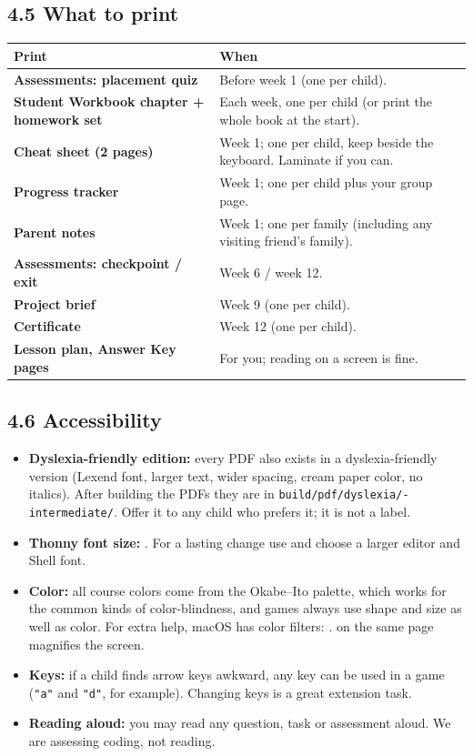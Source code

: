 \documentclass[level=2,teacher]{kidscode}
\begin{document}
\subsection{4.5 What to print}
\begin{tabularx}{\linewidth}{@{}>{\bfseries}p{4.8cm}X@{}}
\toprule
Print & When \\ \midrule
Assessments: placement quiz & Before week 1 (one per child). \\
Student Workbook chapter + homework set & Each week, one per child (or print the whole book at the start). \\
Cheat sheet (2 pages) & Week 1; one per child, keep beside the keyboard. Laminate if you can. \\
Progress tracker & Week 1; one per child plus your group page. \\
Parent notes & Week 1; one per family (including any visiting friend's family). \\
Assessments: checkpoint / exit & Week 6 / week 12. \\
Project brief & Week 9 (one per child). \\
Certificate & Week 12 (one per child). \\
Lesson plan, Answer Key pages & For you; reading on a screen is fine. \\
\bottomrule
\end{tabularx}

\subsection{4.6 Accessibility}
\begin{itemize}[itemsep=1pt]
  \item \textbf{Dyslexia-friendly edition:} every PDF also exists in a dyslexia-friendly version
        (Lexend font, larger text, wider spacing, cream paper color, no italics). After building
        the PDFs they are in \texttt{build/\allowbreak pdf/\allowbreak dyslexia/-intermediate/}. Offer it to any child
        who prefers it; it is not a label.
  \item \textbf{Thonny font size:} . For a lasting change use
         and choose a larger editor and Shell font.
  \item \textbf{Color:} all course colors come from the Okabe--Ito palette, which works for the
        common kinds of color-blindness, and games always use shape and size as well as color.
        For extra help, macOS has color filters: .  on the same page magnifies the screen.
  \item \textbf{Keys:} if a child finds arrow keys awkward, any key can be used in a game
        (\texttt{"a"} and \texttt{"d"}, for example). Changing keys is a great extension task.
  \item \textbf{Reading aloud:} you may read any question, task or assessment aloud. We are
        assessing coding, not reading.
\end{itemize}
\end{document}
